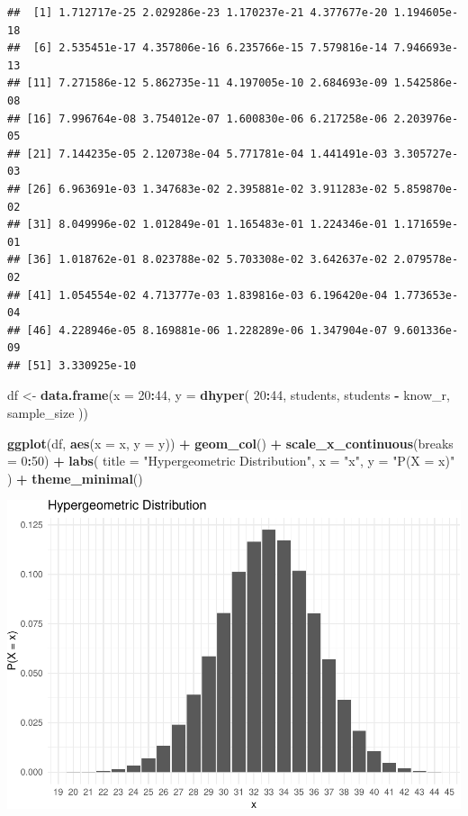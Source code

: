 \documentclass[
]{article}
\newenvironment{Shaded}{\begin{snugshade}}{\end{snugshade}}
\newcommand{\DataTypeTok}[1]{\textcolor[rgb]{0.13,0.29,0.53}{#1}}
\newcommand{\DecValTok}[1]{\textcolor[rgb]{0.00,0.00,0.81}{#1}}
\newcommand{\KeywordTok}[1]{\textcolor[rgb]{0.13,0.29,0.53}{\textbf{#1}}}
\newcommand{\NormalTok}[1]{#1}
\newcommand{\OperatorTok}[1]{\textcolor[rgb]{0.81,0.36,0.00}{\textbf{#1}}}
\newcommand{\StringTok}[1]{\textcolor[rgb]{0.31,0.60,0.02}{#1}}
\begin{document}
\begin{verbatim}
##  [1] 1.712717e-25 2.029286e-23 1.170237e-21 4.377677e-20 1.194605e-18
##  [6] 2.535451e-17 4.357806e-16 6.235766e-15 7.579816e-14 7.946693e-13
## [11] 7.271586e-12 5.862735e-11 4.197005e-10 2.684693e-09 1.542586e-08
## [16] 7.996764e-08 3.754012e-07 1.600830e-06 6.217258e-06 2.203976e-05
## [21] 7.144235e-05 2.120738e-04 5.771781e-04 1.441491e-03 3.305727e-03
## [26] 6.963691e-03 1.347683e-02 2.395881e-02 3.911283e-02 5.859870e-02
## [31] 8.049996e-02 1.012849e-01 1.165483e-01 1.224346e-01 1.171659e-01
## [36] 1.018762e-01 8.023788e-02 5.703308e-02 3.642637e-02 2.079578e-02
## [41] 1.054554e-02 4.713777e-03 1.839816e-03 6.196420e-04 1.773653e-04
## [46] 4.228946e-05 8.169881e-06 1.228289e-06 1.347904e-07 9.601336e-09
## [51] 3.330925e-10
\end{verbatim}

\begin{Shaded}
\begin{Highlighting}[]
\NormalTok{df \textless{}{-}}\StringTok{ }\KeywordTok{data.frame}\NormalTok{(}\DataTypeTok{x =} \DecValTok{20}\OperatorTok{:}\DecValTok{44}\NormalTok{, }\DataTypeTok{y =} \KeywordTok{dhyper}\NormalTok{(}
  \DecValTok{20}\OperatorTok{:}\DecValTok{44}\NormalTok{,}
\NormalTok{  students,}
\NormalTok{  students }\OperatorTok{{-}}\StringTok{ }\NormalTok{know\_r,}
\NormalTok{  sample\_size}
\NormalTok{))}

\KeywordTok{ggplot}\NormalTok{(df, }\KeywordTok{aes}\NormalTok{(}\DataTypeTok{x =}\NormalTok{ x, }\DataTypeTok{y =}\NormalTok{ y)) }\OperatorTok{+}
\StringTok{  }\KeywordTok{geom\_col}\NormalTok{() }\OperatorTok{+}
\StringTok{  }\KeywordTok{scale\_x\_continuous}\NormalTok{(}\DataTypeTok{breaks =} \DecValTok{0}\OperatorTok{:}\DecValTok{50}\NormalTok{) }\OperatorTok{+}
\StringTok{  }\KeywordTok{labs}\NormalTok{(}
    \DataTypeTok{title =} \StringTok{"Hypergeometric Distribution"}\NormalTok{,}
    \DataTypeTok{x =} \StringTok{"x"}\NormalTok{,}
    \DataTypeTok{y =} \StringTok{"P(X = x)"}
\NormalTok{  ) }\OperatorTok{+}
\StringTok{  }\KeywordTok{theme\_minimal}\NormalTok{()}
\end{Highlighting}
\end{Shaded}

\includegraphics{es_files/figure-latex/unnamed-chunk-22-1.pdf}
\end{document}
